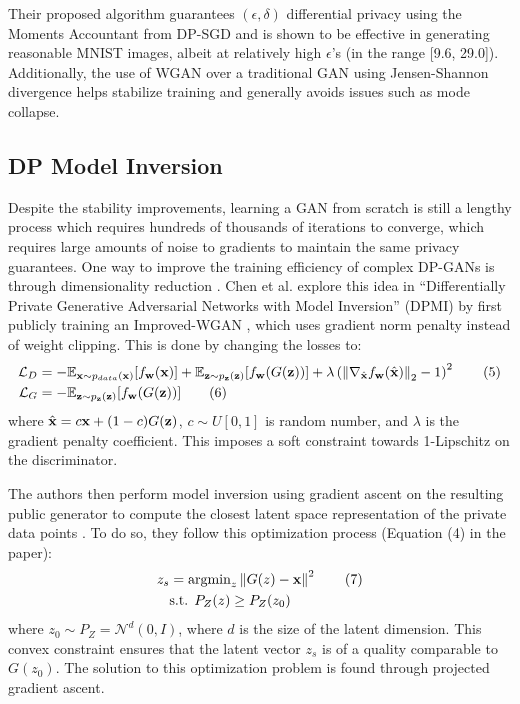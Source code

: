 \documentclass{article}
\begin{document}
Their proposed algorithm guarantees $(\epsilon, \delta)$ differential privacy using the Moments Accountant from DP-SGD \cite{dpsgd} and is shown to be effective in generating reasonable MNIST images, albeit at relatively high $\epsilon$’s (in the range [9.6, 29.0]).
Additionally, the use of WGAN over a traditional GAN \cite{gan} using Jensen-Shannon divergence helps stabilize training and generally avoids issues such as mode collapse.



\subsection{DP Model Inversion}

Despite the stability improvements, learning a GAN from scratch is still a lengthy process which requires hundreds of thousands of iterations to converge, which requires large amounts of noise to gradients to maintain the same privacy guarantees. One way to improve the training efficiency of complex DP-GANs is through dimensionality reduction \cite{stable_gan}. Chen et al. explore this idea in “Differentially Private Generative Adversarial Networks with Model Inversion” (DPMI) by first publicly training an Improved-WGAN \cite{improved_wgan}, which uses gradient norm penalty instead of weight clipping. This is done by changing the losses to:
\begin{align*}
    \mathcal{L}_D &= -\mathbb{E}_{\textbf{x} \sim p_{data}(\textbf{x})} [f_{\textbf{w}} (\textbf{x})] + \mathbb{E}_{\textbf{z} \sim p_{\textbf{z}} (\textbf{z})} [f_{\textbf{w}} (G(\textbf{z}))] + \lambda \left( \left\lVert \nabla_{\hat{\textbf{x}}} f_{\textbf{w}}(\hat{\textbf{x}}) \right\rVert_2 - 1\right)^2
    \tag{5}
    \\
    \mathcal{L}_G &= -\mathbb{E}_{\textbf{z} \sim p_{\textbf{z}} (\textbf{z})} [f_{\textbf{w}} (G(\textbf{z}))]
    \tag{6}
\end{align*}
where $\hat{\textbf{x}} = c \textbf{x} + (1-c) G(\textbf{z})$, $c \sim U[0, 1]$ is random number, and $\lambda$ is the gradient penalty coefficient. This imposes a soft constraint towards 1-Lipschitz on the discriminator.

The authors then perform model inversion using gradient ascent on the resulting public generator to compute the closest latent space representation of the private data points \cite{dpmi}. To do so, they follow this optimization process (Equation (4) in the paper): 
\begin{align*}
    z_s &= \text{argmin}_{z} \left\lVert G(z) - \textbf{x}\right\rVert^2
    \tag{7}\\
    &\text{s.t. } P_Z (z) \geq P_Z (z_0)
\end{align*}
where $z_0 \sim P_Z = \mathcal{N}^d(0, I)$, where $d$ is the size of the latent dimension. This convex constraint ensures that the latent vector $z_s$ is of a quality comparable to $G(z_0)$. The solution to this optimization problem is found through projected gradient ascent.
\end{document}
